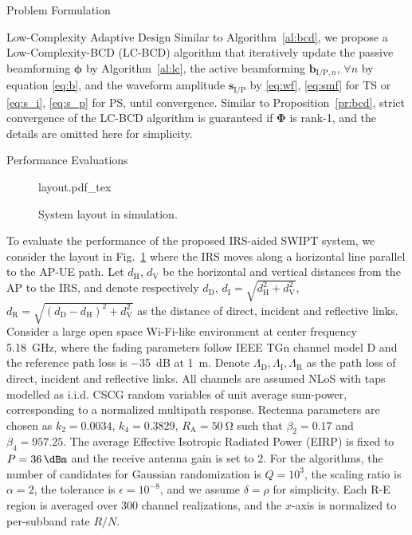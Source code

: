 \documentclass[journal]{IEEEtran}
\begin{document}
\begin{section}{Problem Formulation}
\begin{subsection}{Low-Complexity Adaptive Design}
			Similar to Algorithm~\ref{al:bcd}, we propose a Low-Complexity-BCD (LC-BCD) algorithm that iteratively update the passive beamforming $\boldsymbol{\phi}$ by Algorithm~\ref{al:lc}, the active beamforming $\boldsymbol{b}_{\mathrm{I/P},n}$, $\forall n$ by equation \eqref{eq:b}, and the waveform amplitude $\boldsymbol{s}_{\mathrm{I/P}}$ by \eqref{eq:wf}, \eqref{eq:smf} for TS or \eqref{eq:s_i}, \eqref{eq:s_p} for PS, until convergence. Similar to Proposition~\ref{pr:bcd}, strict convergence of the LC-BCD algorithm is guaranteed if $\boldsymbol{\Phi}$ is rank-\num{1}, and the details are omitted here for simplicity.
		\end{subsection}
	\end{section}


	\begin{section}{Performance Evaluations}\label{se:performance_evaluation}
		\begin{figure}[!t]
			\centering
			\def\svgwidth{0.9\columnwidth}
			{layout.pdf_tex}
			\caption{System layout in simulation.}
			\label{fi:layout}
		\end{figure}
		To evaluate the performance of the proposed IRS-aided SWIPT system, we consider the layout in Fig.~\ref{fi:layout} where the IRS moves along a horizontal line parallel to the AP-UE path. Let $d_{\mathrm{H}}$, $d_{\mathrm{V}}$ be the horizontal and vertical distances from the AP to the IRS, and denote respectively $d_{\mathrm{D}}$, $d_{\mathrm{I}}=\sqrt{d_{\mathrm{H}}^2+d_{\mathrm{V}}^2}$, $d_{\mathrm{R}}=\sqrt{(d_{\mathrm{D}}-d_{\mathrm{H}})^2+d_{\mathrm{V}}^2}$ as the distance of direct, incident and reflective links. Consider a large open space Wi-Fi-like environment at center frequency \SI{5.18}{\GHz}, where the fading parameters follow IEEE TGn channel model D \cite{Erceg2004} and the reference path loss is \SI{-35}{\dB} at \SI{1}{\meter}. Denote $\Lambda_{\mathrm{D}},\Lambda_{\mathrm{I}},\Lambda_{\mathrm{R}}$ as the path loss of direct, incident and reflective links. All channels are assumed NLoS with taps modelled as i.i.d. CSCG random variables of unit average sum-power, corresponding to a normalized multipath response. Rectenna parameters are chosen as $k_2=0.0034$, $k_4=0.3829$, $R_{\mathrm{A}}=\SI{50}{\ohm}$ such that $\beta_2=0.17$ and $\beta_4=957.25$. The average Effective Isotropic Radiated Power (EIRP) is fixed to $P=\SI{36}{\dBm}$ and the receive antenna gain is set to \SI{2}{\dBi}. For the algorithms, the number of candidates for Gaussian randomization is $Q=10^{3}$, the scaling ratio is $\alpha=2$, the tolerance is $\epsilon=10^{-8}$, and we assume $\delta=\rho$ for simplicity. Each R-E region is averaged over \num{300} channel realizations, and the $x$-axis is normalized to per-subband rate $R/N$.


\end{section}
\end{document}
